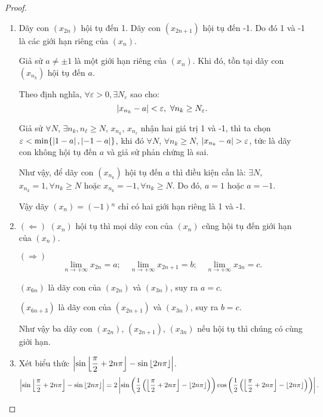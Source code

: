 \documentclass[class=analysis,crop=false]{standalone}
\begin{document}
\begin{proof}
    \begin{enumerate}[label = (\roman*)]
        \item Dãy con $(x_{2n})$ hội tụ đến 1. Dãy con $(x_{2n+1})$ hội tụ đến -1. Do đó 1 và -1 là các giới hạn riêng của $(x_{n})$.
              \par Giả sử $a\ne\pm{1}$ là một giới hạn riêng của $(x_{n})$. Khi đó, tồn tại dãy con $(x_{n_{k}})$ hội tụ đến $a$.
              \par Theo định nghĩa, $\forall\varepsilon > 0, \exists N_{\varepsilon}$ sao cho:
              \[
                  \left\vert{x_{n_{k}} - a}\right\vert < \varepsilon,\ \forall n_{k}\ge N_{\varepsilon}.
              \]
              \par Giả sử $\forall N$, $\exists n_{k}, n_{\ell}\ge N$, $x_{n_{k}}$, $x_{n_{\ell}}$ nhận hai giá trị 1 và -1, thì ta chọn $\varepsilon < \min\{ \left\vert{1 - a}\right\vert, \left\vert{-1 - a}\right\vert \}$, khi đó $\forall N$, $\forall n_{k}\ge N$, $\left\vert{x_{n_{k}} - a}\right\vert > \varepsilon$, tức là dãy con không hội tụ đến $a$ và giả sử phản chứng là sai.
              \par Như vậy, để dãy con $(x_{n_{k}})$ hội tụ đến $a$ thì điều kiện cần là: $\exists N$, $x_{n_{k}} = 1, \forall n_{k}\ge N$ hoặc $x_{n_{k}} = -1, \forall n_{k}\ge N$. Do đó, $a = 1$ hoặc $a = -1$.
              \bigskip
              \par Vậy dãy $(x_{n}) = (-1){}^{n}$ chỉ có hai giới hạn riêng là 1 và -1.
        \item $(\Leftarrow)$ $(x_{n})$ hội tụ thì mọi dãy con của $(x_{n})$ cũng hội tụ đến giới hạn của $(x_{n})$.
              \par $(\Rightarrow)$
              \[
                  \lim\limits_{n\to+\infty}x_{2n} = a;\quad\lim\limits_{n\to+\infty}x_{2n+1} = b;\quad\lim\limits_{n\to+\infty}x_{3n} = c.
              \]
              \par $(x_{6n})$ là dãy con của $(x_{2n})$ và $(x_{3n})$, suy ra $a = c$.
              \par $(x_{6n+3})$ là dãy con của $(x_{2n+1})$ và $(x_{3n})$, suy ra $b = c$.
              \par Như vậy ba dãy con $(x_{2n})$, $(x_{2n+1})$, $(x_{3n})$ nếu hội tụ thì chúng có cùng giới hạn.
        \item Xét biểu thức $\left\vert{\sin\left\lfloor{\dfrac{\pi}{2} + 2n\pi}\right\rfloor - \sin\left\lfloor{2n\pi}\right\rfloor}\right\vert$.
              \[
                  \left\vert{\sin\left\lfloor{\dfrac{\pi}{2} + 2n\pi}\right\rfloor - \sin\left\lfloor{2n\pi}\right\rfloor}\right\vert = 2\left\vert{\sin\left(\dfrac{1}{2}\left(\left\lfloor{\dfrac{\pi}{2} + 2n\pi}\right\rfloor - \left\lfloor{2n\pi}\right\rfloor\right)\right)\cos\left(\dfrac{1}{2}\left(\left\lfloor{\dfrac{\pi}{2} + 2n\pi}\right\rfloor - \left\lfloor{2n\pi}\right\rfloor\right)\right)}\right\vert.
\]
\end{enumerate}
\end{proof}
\end{document}

